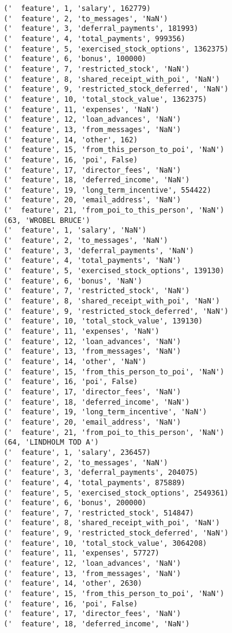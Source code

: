 \begin{verbatim}
('  feature', 1, 'salary', 162779)
('  feature', 2, 'to_messages', 'NaN')
('  feature', 3, 'deferral_payments', 181993)
('  feature', 4, 'total_payments', 999356)
('  feature', 5, 'exercised_stock_options', 1362375)
('  feature', 6, 'bonus', 100000)
('  feature', 7, 'restricted_stock', 'NaN')
('  feature', 8, 'shared_receipt_with_poi', 'NaN')
('  feature', 9, 'restricted_stock_deferred', 'NaN')
('  feature', 10, 'total_stock_value', 1362375)
('  feature', 11, 'expenses', 'NaN')
('  feature', 12, 'loan_advances', 'NaN')
('  feature', 13, 'from_messages', 'NaN')
('  feature', 14, 'other', 162)
('  feature', 15, 'from_this_person_to_poi', 'NaN')
('  feature', 16, 'poi', False)
('  feature', 17, 'director_fees', 'NaN')
('  feature', 18, 'deferred_income', 'NaN')
('  feature', 19, 'long_term_incentive', 554422)
('  feature', 20, 'email_address', 'NaN')
('  feature', 21, 'from_poi_to_this_person', 'NaN')
(63, 'WROBEL BRUCE')
('  feature', 1, 'salary', 'NaN')
('  feature', 2, 'to_messages', 'NaN')
('  feature', 3, 'deferral_payments', 'NaN')
('  feature', 4, 'total_payments', 'NaN')
('  feature', 5, 'exercised_stock_options', 139130)
('  feature', 6, 'bonus', 'NaN')
('  feature', 7, 'restricted_stock', 'NaN')
('  feature', 8, 'shared_receipt_with_poi', 'NaN')
('  feature', 9, 'restricted_stock_deferred', 'NaN')
('  feature', 10, 'total_stock_value', 139130)
('  feature', 11, 'expenses', 'NaN')
('  feature', 12, 'loan_advances', 'NaN')
('  feature', 13, 'from_messages', 'NaN')
('  feature', 14, 'other', 'NaN')
('  feature', 15, 'from_this_person_to_poi', 'NaN')
('  feature', 16, 'poi', False)
('  feature', 17, 'director_fees', 'NaN')
('  feature', 18, 'deferred_income', 'NaN')
('  feature', 19, 'long_term_incentive', 'NaN')
('  feature', 20, 'email_address', 'NaN')
('  feature', 21, 'from_poi_to_this_person', 'NaN')
(64, 'LINDHOLM TOD A')
('  feature', 1, 'salary', 236457)
('  feature', 2, 'to_messages', 'NaN')
('  feature', 3, 'deferral_payments', 204075)
('  feature', 4, 'total_payments', 875889)
('  feature', 5, 'exercised_stock_options', 2549361)
('  feature', 6, 'bonus', 200000)
('  feature', 7, 'restricted_stock', 514847)
('  feature', 8, 'shared_receipt_with_poi', 'NaN')
('  feature', 9, 'restricted_stock_deferred', 'NaN')
('  feature', 10, 'total_stock_value', 3064208)
('  feature', 11, 'expenses', 57727)
('  feature', 12, 'loan_advances', 'NaN')
('  feature', 13, 'from_messages', 'NaN')
('  feature', 14, 'other', 2630)
('  feature', 15, 'from_this_person_to_poi', 'NaN')
('  feature', 16, 'poi', False)
('  feature', 17, 'director_fees', 'NaN')
('  feature', 18, 'deferred_income', 'NaN')

\end{verbatim}

